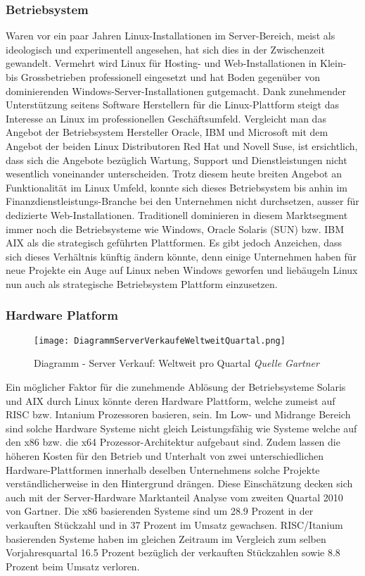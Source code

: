 \subsubsection{Betriebsystem}
Waren vor ein paar Jahren Linux-Installationen im Server-Bereich, meist als ideologisch und experimentell angesehen, hat sich dies in der Zwischenzeit gewandelt.
Vermehrt wird Linux für Hosting- und Web-Installationen in Klein- bis Grossbetrieben professionell eingesetzt und hat Boden gegenüber von dominierenden Windows-Server-Installationen gutgemacht. Dank zunehmender Unterstützung seitens Software Herstellern für die Linux-Plattform steigt das Interesse an Linux im professionellen Geschäftsumfeld. Vergleicht man das Angebot der Betriebsystem Hersteller Oracle, IBM und Microsoft mit dem Angebot der beiden Linux Distributoren Red Hat und Novell Suse, ist ersichtlich, dass sich die Angebote bezüglich Wartung, Support und Dienstleistungen nicht wesentlich voneinander unterscheiden. 
Trotz diesem heute breiten Angebot an Funktionalität im Linux Umfeld, konnte sich dieses Betriebsystem bis anhin im Finanzdienstleistungs-Branche bei den Unternehmen nicht durchsetzen, ausser für dedizierte Web-Installationen. Traditionell dominieren in diesem Marktsegment immer noch die Betriebsysteme wie Windows, Oracle Solaris (SUN) bzw. IBM AIX als die strategisch geführten Plattformen. Es gibt jedoch Anzeichen, dass sich dieses Verhältnis künftig ändern könnte, denn einige Unternehmen haben für neue Projekte ein Auge auf Linux neben Windows geworfen und liebäugeln Linux nun auch als strategische  Betriebsystem Plattform einzusetzen.

\subsubsection{Hardware Platform}
\begin{figure}[htb]
\centering
\texttt{[image: DiagrammServerVerkaufeWeltweitQuartal.png]}
\caption{Diagramm - Server Verkauf: Weltweit pro Quartal \textit{Quelle Gartner}}
\label{fig:DiagrammServerVerkaufeWeltweitQuartal}
\end{figure}

Ein möglicher Faktor für die zunehmende Ablösung der Betriebsysteme Solaris und AIX durch Linux könnte deren Hardware Plattform, welche zumeist auf RISC bzw. Intanium Prozessoren basieren, sein. 
Im Low- und Midrange Bereich sind solche Hardware Systeme nicht gleich Leistungsfähig wie Systeme welche auf den x86 bzw. die x64 Prozessor-Architektur aufgebaut sind. Zudem lassen die höheren Kosten für den Betrieb und Unterhalt von zwei unterschiedlichen Hardware-Plattformen innerhalb deselben Unternehmens solche Projekte verständlicherweise in den Hintergrund drängen.
Diese Einschätzung decken sich auch mit der Server-Hardware Marktanteil Analyse vom zweiten Quartal 2010 von Gartner. Die x86 basierenden Systeme sind um 28.9 Prozent in der verkauften Stückzahl und in 37 Prozent im Umsatz gewachsen. RISC/Itanium basierenden Systeme haben im gleichen Zeitraum  im Vergleich zum selben Vorjahresquartal 16.5 Prozent bezüglich der verkauften Stückzahlen sowie 8.8 Prozent beim Umsatz verloren.

